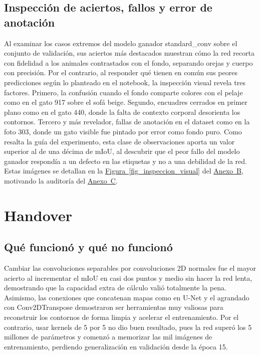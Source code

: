 \documentclass[10pt,letterpaper]{article}
\newcommand{\sangria}{\hspace*{1.5em}}
\newcommand{\reffigura}[1]{\hyperref[#1]{Figura~\ref*{#1}}}
\newcommand{\refanexo}[2]{\hyperref[#1]{Anexo~#2}}
\begin{document}
\subsection{Inspección de aciertos, fallos y error de anotación}

\sangria Al examinar los casos extremos del modelo ganador standard\_conv sobre el conjunto de validación, sus aciertos más destacados muestran cómo la red recorta con fidelidad a los animales contrastados con el fondo, separando orejas y cuerpo con precisión. Por el contrario, al responder qué tienen en común sus peores predicciones según lo planteado en el notebook, la inspección visual revela tres factores. Primero, la confusión cuando el fondo comparte colores con el pelaje como en el gato 917 sobre el sofá beige. Segundo, encuadres cerrados en primer plano como en el gato 440, donde la falta de contexto corporal desorienta los contornos. Tercero y más revelador, fallas de anotación en el dataset como en la foto 303, donde un gato visible fue pintado por error como fondo puro. Como resalta la guía del experimento, esta clase de observaciones aporta un valor superior al de una décima de mIoU, al descubrir que el peor fallo del modelo ganador respondía a un defecto en las etiquetas y no a una debilidad de la red. Estas imágenes se detallan en la \reffigura{fig_inspeccion_visual} del \refanexo{anexo_b}{B}, motivando la auditoría del \refanexo{anexo_c}{C}.

\section{Handover}

\subsection{Qué funcionó y qué no funcionó}

\sangria Cambiar las convoluciones separables por convoluciones 2D normales fue el mayor acierto al incrementar el mIoU en casi dos puntos y medio sin hacer la red lenta, demostrando que la capacidad extra de cálculo valió totalmente la pena. Asimismo, las conexiones que concatenan mapas como en U-Net y el agrandado con Conv2DTranspose demostraron ser herramientas muy valiosas para reconstruir los contornos de forma limpia y acelerar el entrenamiento. Por el contrario, usar kernels de 5 por 5 no dio buen resultado, pues la red superó los 5 millones de parámetros y comenzó a memorizar las mil imágenes de entrenamiento, perdiendo generalización en validación desde la época 15.
\end{document}
